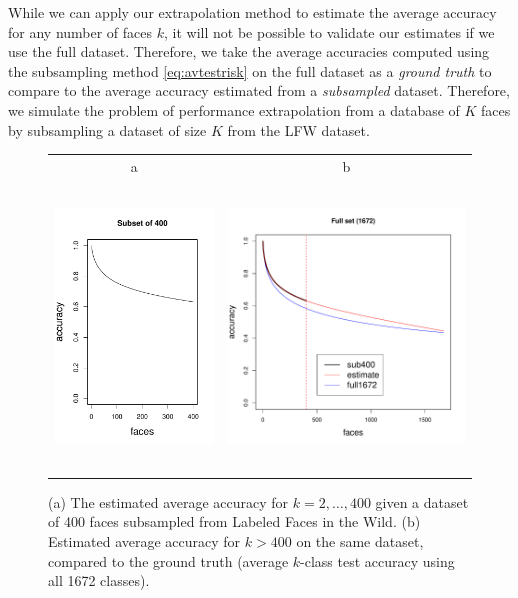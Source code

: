 While we can apply our extrapolation method to estimate the average
accuracy for any number of faces $k$, it will not be possible to
validate our estimates if we use the full dataset.  Therefore, we take
the average accuracies computed using the subsampling method
\eqref{eq:avtestrisk} on the full dataset as a \emph{ground truth} to
compare to the average accuracy estimated from a \emph{subsampled}
dataset.  Therefore, we simulate the problem of performance
extrapolation from a database of $K$ faces by subsampling a
dataset of size $K$ from the LFW dataset.

\begin{figure}
\centering
\begin{tabular}{cc}
a & b\\
\includegraphics[height = 3in]{../../facerec/acc_plot1.pdf} &
\includegraphics[height = 3in]{../../facerec/acc_plot2.pdf}
\end{tabular}
\caption{(a) The estimated average accuracy for $k = 2,\hdots,
  400$ given a dataset of 400 faces subsampled from Labeled Faces in
  the Wild.  (b) Estimated average accuracy for $k > 400$ on the
  same dataset, compared to the ground truth (average $k$-class test accuracy
  using all 1672 classes).}
\label{fig:lfw_extrapolation1}
\end{figure}

